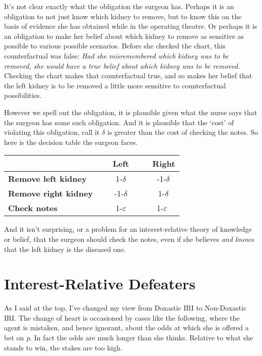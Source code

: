 \documentclass[
  11pt,
  letterpaper,
  DIV=11,
  numbers=noendperiod,
  twoside]{scrartcl}
\begin{document}
It's not clear exactly what the obligation the surgeon has. Perhaps it
is an obligation to not just know which kidney to remove, but to know
this on the basis of evidence she has obtained while in the operating
theatre. Or perhaps it is an obligation to make her belief about which
kidney to remove as sensitive as possible to various possible scenarios.
Before she checked the chart, this counterfactual was false: \emph{Had
she misremembered which kidney was to be removed, she would have a true
belief about which kidney was to be removed.} Checking the chart makes
that counterfactual true, and so makes her belief that the left kidney
is to be removed a little more sensitive to counterfactual
possibilities.

However we spell out the obligation, it is plausible given what the
nurse says that the surgeon has some such obligation. And it is
plausible that the `cost' of violating this obligation, call it
\(\delta\) is greater than the cost of checking the notes. So here is
the decision table the surgeon faces.

\begin{longtable}[]{@{}lcc@{}}
\toprule\noalign{}
~ & ~ \textbf{Left} ~ & ~ \textbf{Right} \\
\midrule\noalign{}
\endhead
\bottomrule\noalign{}
\endlastfoot
\textbf{Remove left kidney} ~ & ~ 1-\(\delta\) ~ & ~ -1-\(\delta\) \\
\textbf{Remove right kidney}~ & ~ -1-\(\delta\) ~ & ~ 1-\(\delta\) \\
\textbf{Check notes} ~ & ~1-\(\varepsilon\)~ & ~1-\(\varepsilon\) \\
\end{longtable}

And it isn't surprising, or a problem for an interest-relative theory of
knowledge or belief, that the surgeon should check the notes, even if
she believes \emph{and knows} that the left kidney is the diseased one.

\section{Interest-Relative Defeaters}\label{sec-3}

As I said at the top, I've changed my view from Doxastic IRI to
Non-Doxastic IRI. The change of heart is occasioned by cases like the
following, where the agent is mistaken, and hence ignorant, about the
odds at which she is offered a bet on \emph{p}. In fact the odds are
much longer than she thinks. Relative to what she stands to win, the
stakes are too high.
\end{document}
